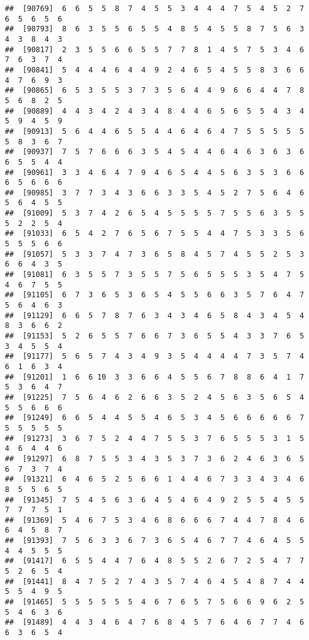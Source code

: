 \documentclass[
]{book}
\begin{document}
\begin{verbatim}
##  [90769]  6  6  5  5  8  7  4  5  5  3  4  4  4  7  5  4  5  2  7  6  5  6  5  6
##  [90793]  8  6  3  5  5  6  5  5  4  8  5  4  5  5  8  7  5  6  3  4  3  8  4  3
##  [90817]  2  3  5  5  6  6  5  5  7  7  8  1  4  5  7  5  3  4  6  7  6  3  7  4
##  [90841]  5  4  4  4  6  4  4  9  2  4  6  5  4  5  5  8  3  6  6  4  7  6  9  3
##  [90865]  6  5  3  5  5  3  7  3  5  6  4  4  9  6  6  4  4  7  8  5  6  8  2  5
##  [90889]  4  4  3  4  2  4  3  4  8  4  4  6  5  6  5  5  4  3  4  5  9  4  5  9
##  [90913]  5  6  4  4  6  5  5  4  4  6  4  6  4  7  5  5  5  5  5  5  8  3  6  7
##  [90937]  7  5  7  6  6  6  3  5  4  5  4  4  6  4  6  3  6  3  6  6  5  5  4  4
##  [90961]  3  3  4  6  4  7  9  4  6  5  4  4  5  6  3  5  3  6  6  6  5  6  6  6
##  [90985]  3  7  7  3  4  3  6  6  3  3  5  4  5  2  7  5  6  4  6  5  6  4  5  5
##  [91009]  5  3  7  4  2  6  5  4  5  5  5  5  7  5  5  6  3  5  5  5  2  2  5  4
##  [91033]  6  5  4  2  7  6  5  6  7  5  5  4  4  7  5  3  3  5  6  5  5  5  6  6
##  [91057]  5  3  3  7  4  7  3  6  5  8  4  5  7  4  5  5  2  5  3  6  6  4  3  5
##  [91081]  6  3  5  5  7  3  5  5  7  5  6  5  5  5  3  5  4  7  5  4  6  7  5  5
##  [91105]  6  7  3  6  5  3  6  5  4  5  5  6  6  3  5  7  6  4  7  5  6  4  6  3
##  [91129]  6  6  5  7  8  7  6  3  4  3  4  6  5  8  4  3  4  5  4  8  3  6  6  2
##  [91153]  5  2  6  5  5  7  6  6  7  3  6  5  5  4  3  3  7  6  5  3  4  5  5  4
##  [91177]  5  6  5  7  4  3  4  9  3  5  4  4  4  4  7  3  5  7  4  6  1  6  3  4
##  [91201]  1  6  6 10  3  3  6  6  4  5  5  6  7  8  8  6  4  1  7  5  3  6  4  7
##  [91225]  7  5  6  4  6  2  6  6  3  5  2  4  5  6  3  5  6  5  4  5  5  6  6  6
##  [91249]  6  6  5  4  4  5  5  4  6  5  3  4  5  6  6  6  6  6  7  5  5  5  5  5
##  [91273]  3  6  7  5  2  4  4  7  5  5  3  7  6  5  5  5  3  1  5  4  6  4  4  6
##  [91297]  6  8  7  5  5  3  4  3  5  3  7  3  6  2  4  6  3  6  5  6  7  3  7  4
##  [91321]  6  4  6  5  2  5  6  6  1  4  4  6  7  3  3  4  3  4  6  8  5  5  6  5
##  [91345]  7  5  4  5  6  3  6  4  5  4  6  4  9  2  5  5  4  5  5  7  7  7  5  1
##  [91369]  5  4  6  7  5  3  4  6  8  6  6  6  7  4  4  7  8  4  6  6  4  5  8  7
##  [91393]  7  5  6  3  3  6  7  3  6  5  4  6  7  7  4  6  4  5  5  4  4  5  5  5
##  [91417]  6  5  5  4  4  7  6  4  8  5  5  2  6  7  2  5  4  7  7  5  2  6  5  4
##  [91441]  8  4  7  5  2  7  4  3  5  7  4  6  4  5  4  8  7  4  4  5  5  4  9  5
##  [91465]  5  5  5  5  5  5  4  6  7  6  5  7  5  6  6  9  6  2  5  5  4  6  3  6
##  [91489]  4  4  3  4  6  4  7  6  8  4  5  7  6  4  6  7  7  4  6  6  3  6  5  4

\end{verbatim}
\end{document}

